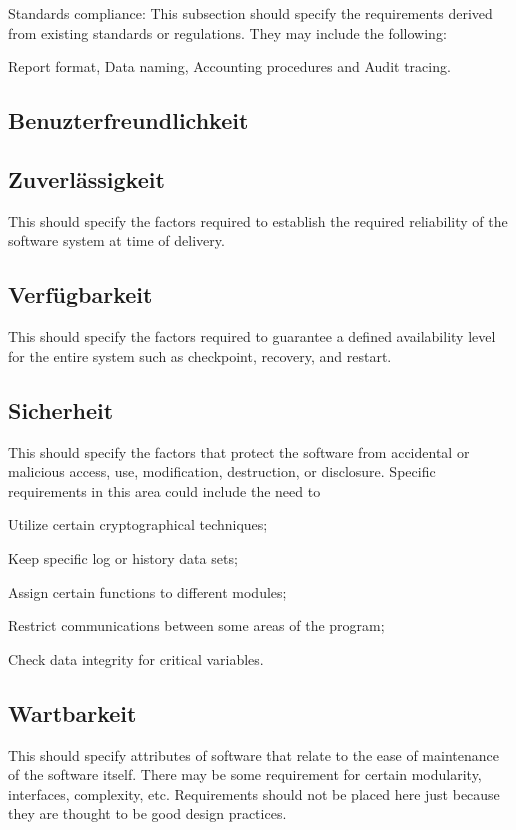 {		Standards compliance: This subsection should specify the requirements derived from existing standards or regulations. They may include the following: 
		
		Report format, Data naming, Accounting procedures and Audit tracing.
	
	\subsection{Benuzterfreundlichkeit}

	\subsection{Zuverlässigkeit}
		This should specify the factors required to establish the required reliability of the software system at time of delivery.
	
	\subsection{Verfügbarkeit}
		This should specify the factors required to guarantee a defined availability level for the entire system such as checkpoint, recovery, and restart. 
	
	\subsection{Sicherheit}
		This should specify the factors that protect the software from accidental or malicious access, use, modification, destruction, or disclosure. Specific requirements in this area could include the need to
		
		Utilize certain cryptographical techniques; 
		
		Keep specific log or history data sets;
		
		Assign certain functions to different modules;
		
		Restrict communications between some areas of the program;
		
		Check data integrity for critical variables.
	
	\subsection{Wartbarkeit}
		This should specify attributes of software that relate to the ease of maintenance of the software itself. There may be some requirement for certain modularity, interfaces, complexity, etc. Requirements should not be placed here just because they are thought to be good design practices.
	
}
